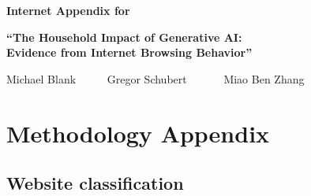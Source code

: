 \documentclass[12pt]{article}
\begin{document}
\clearpage
\newpage  


\begin{center}
\Large{\bf Internet Appendix for}

\Large{\bf {``The Household Impact of Generative AI: \\
Evidence from Internet Browsing Behavior''}} \end{center} \centerline{\large  } \centerline{\large  {Michael Blank} \ \ \ \ \  {Gregor Schubert } \ \ \ \ \ \     {Miao Ben Zhang}  } \setcounter{table}{0} \setcounter{figure}{0} \setcounter{section}{0} \renewcommand{\thetable}{IA.\arabic{table}} \renewcommand{\thefigure}{IA.\arabic{figure}}  %

\clearpage 
\renewcommand{\thetable}{IA.\arabic{table}}
\renewcommand{\thefigure}{IA.\arabic{figure}}
\setcounter{equation}{0}
\renewcommand{\thesection}{IA.\arabic{section}}
\renewcommand{\theHsection}{IA.\arabic{section}}
\setcounter{section}{0}
\onehalfspacing
\section{Methodology Appendix} \label{ia.sec:appx_methodology}


\subsection{Website classification}
\end{document}
